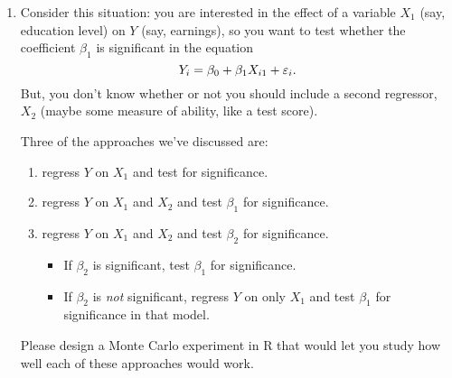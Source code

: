 \begin{enumerate}
\item Consider this situation: you are interested in the effect of a
  variable $X_1$ (say, education level) on $Y$ (say, earnings), so you
  want to test whether the coefficient $\beta_1$ is significant in the
  equation
  \begin{equation*}
    Y_{i} = \beta_0 + \beta_1 X_{i1} + \varepsilon_i.
  \end{equation*}
  But, you don't know whether or not you should include a second
  regressor, $X_2$ (maybe some measure of ability, like a test score).

  Three of the approaches we've discussed are:
  \begin{enumerate}
  \item regress $Y$ on $X_1$ and test for significance.
  \item regress $Y$ on $X_1$ and $X_2$ and test $\beta_1$ for significance.
  \item regress $Y$ on $X_1$ and $X_2$ and test $\beta_2$ for significance.
    \begin{itemize}
    \item If $\beta_2$ is significant, test $\beta_1$ for significance.
    \item If $\beta_2$ is \emph{not} significant, regress $Y$ on only $X_1$
      and test $\beta_1$ for significance in that model.
    \end{itemize}
  \end{enumerate}

  Please design a Monte Carlo experiment in R that would let you study
  how well each of these approaches would work.

\end{enumerate}

